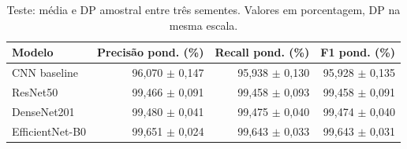 \begin{table}[htbp]
\centering
\caption{Teste: média e DP amostral entre três sementes. Valores em porcentagem, DP na mesma escala.}
\label{tab:test-weighted}
\small
\begin{tabular}{lrrr}
\toprule
Modelo & Precisão pond. (\%) & Recall pond. (\%) & F1 pond. (\%) \\
\midrule
CNN baseline & 96,070 $\pm$ 0,147 & 95,938 $\pm$ 0,130 & 95,928 $\pm$ 0,135 \\
ResNet50 & 99,466 $\pm$ 0,091 & 99,458 $\pm$ 0,093 & 99,458 $\pm$ 0,091 \\
DenseNet201 & 99,480 $\pm$ 0,041 & 99,475 $\pm$ 0,040 & 99,474 $\pm$ 0,040 \\
EfficientNet-B0 & 99,651 $\pm$ 0,024 & 99,643 $\pm$ 0,033 & 99,643 $\pm$ 0,031 \\
\bottomrule
\end{tabular}
\end{table}
